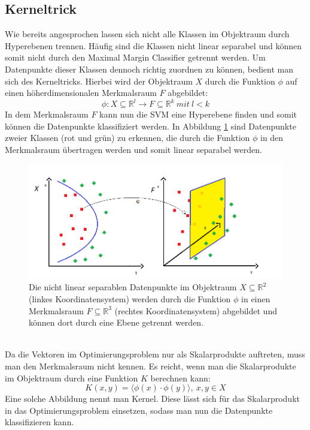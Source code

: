 \subsection{Kerneltrick}
\label{subsec:kernel-trick}
Wie bereits angesprochen lassen sich nicht alle Klassen im Objektraum durch Hyperebenen trennen. Häufig sind die Klassen nicht linear separabel und können somit nicht durch den \glqq{}Maximal Margin Classifier\grqq{} getrennt werden. Um Datenpunkte dieser Klassen dennoch richtig zuordnen zu können, bedient man sich des Kerneltricks. Hierbei wird der Objektraum $X$ durch die Funktion $\phi$ auf einen höherdimensionalen Merkmalsraum $F$ abgebildet:
\[\phi : X \subseteq \mathbb{R}^l \rightarrow F \subseteq \mathbb{R}^k\ mit\ l<k \]
In dem Merkmalsraum $F$ kann nun die SVM eine Hyperebene finden und somit können die Datenpunkte klassifiziert werden. In Abbildung \ref{fig:Objektraum-Merkmalsraum} sind Datenpunkte zweier Klassen (rot und grün) zu erkennen, die durch die Funktion $\phi$ in den Merkmalsraum übertragen werden und somit linear separabel werden.\\
\begin{figure}[hbtp]
\includegraphics[width=1.0\linewidth]{ObjektZuMerkmalsRaum.png}
\caption{Die nicht linear separablen Datenpunkte im Objektraum $X \subseteq \mathbb{R}^2$ (linkes Koordinatensystem) werden durch die Funktion $\phi$ in einen Merkmalsraum $F\subseteq \mathbb{R}^3$ (rechtes Koordinatensystem) abgebildet und können dort durch eine Ebene getrennt werden.}
\label{fig:Objektraum-Merkmalsraum}
\end{figure}\\
Da die Vektoren im Optimierungsproblem nur als Skalarprodukte auftreten, muss man den Merkmalsraum nicht kennen. Es reicht, wenn man die Skalarprodukte im Objektraum durch eine Funktion $K$ berechnen kann:
\[K(x,y) = \langle \phi(x) \cdot \phi(y) \rangle,\ x,y \in X\]
Eine solche Abbildung nennt man Kernel. Diese lässt sich für das Skalarprodukt in das Optimierungsproblem einsetzen, sodass man nun die Datenpunkte klassifizieren kann.\cite{laechele-svm,sayad-svm}


